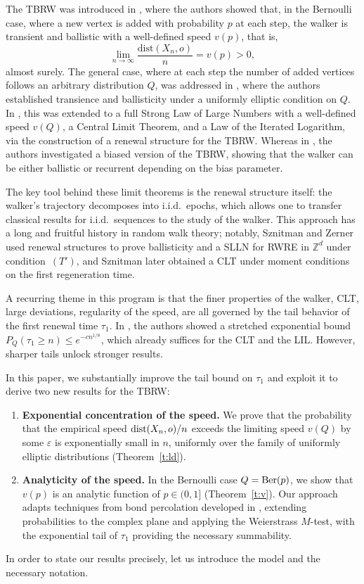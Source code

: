 \documentclass[a4paper]{amsart}
\begin{document}
The TBRW was introduced in \cite{figueiredo2017building}, where the authors showed that, in the Bernoulli case, where a new vertex is added with probability $p$ at each step, the walker is transient and ballistic with a well-defined speed $v(p)$, that is,
$$
\lim_{n\to \infty}\frac{{\text{dist}}(X_n,o)}{n} = v(p) > 0,
$$
almost surely. The general case, where at each step the number of added vertices follows an arbitrary distribution $Q$, was addressed in \cite{IRVZ22}, where the authors established transience and ballisticity under a uniformly elliptic condition on $Q$. In \cite{ribeiro2023}, this was extended to a full Strong Law of Large Numbers with a well-defined speed $v(Q)$, a Central Limit Theorem, and a Law of the Iterated Logarithm, via the construction of a renewal structure for the TBRW. Whereas in \cite{blanc2026}, the authors investigated a biased version of the TBRW, showing that the walker can be either ballistic or recurrent depending on the bias parameter.

The key tool behind these limit theorems is the renewal structure itself: the walker's trajectory decomposes into i.i.d.\ epochs, which allows one to transfer classical results for i.i.d.\ sequences to the study of the walker. This approach has a long and fruitful history in random walk theory; 
notably, Sznitman and Zerner \cite{sznitman_zerner1999} used renewal structures to prove ballisticity and a SLLN for RWRE in $\mathbb{Z}^d$ under condition~$(T')$, and Sznitman \cite{sznitman2000} later obtained a CLT under moment conditions on the first regeneration time.

A recurring theme in this program is that the finer properties of the walker, CLT, large deviations, regularity of the speed, are all governed by the tail behavior of the first renewal time $\tau_1$. In \cite{ribeiro2023}, the authors showed a stretched exponential bound $P_Q(\tau_1 \ge n) \le e^{-cn^{1/8}}$, which already suffices for the CLT and the LIL. However, sharper tails unlock stronger results.

In this paper, we substantially improve the tail bound on $\tau_1$ and exploit it to derive two new results for the TBRW:
\begin{enumerate}[label=(\roman*)]
    \item {\bf Exponential concentration of the speed.} We prove that the probability that the empirical speed ${\rm dist}(X_n,o)/n$ exceeds the limiting speed $v(Q)$ by some $\varepsilon$ is exponentially small in $n$, uniformly over the family of uniformly elliptic distributions (Theorem~\ref{t:ld}).
    \item {\bf Analyticity of the speed.} In the Bernoulli case $Q = {\rm Ber}(p)$, we show that $v(p)$ is an analytic function of $p \in (0,1]$ (Theorem~\ref{t:v}). Our approach adapts techniques from bond percolation developed in \cite{grego}, extending probabilities to the complex plane and applying the Weierstrass $M$-test, with the exponential tail of $\tau_1$ providing the necessary summability.
\end{enumerate}
In order to state our results precisely, let us introduce the model and the necessary notation.
\end{document}

